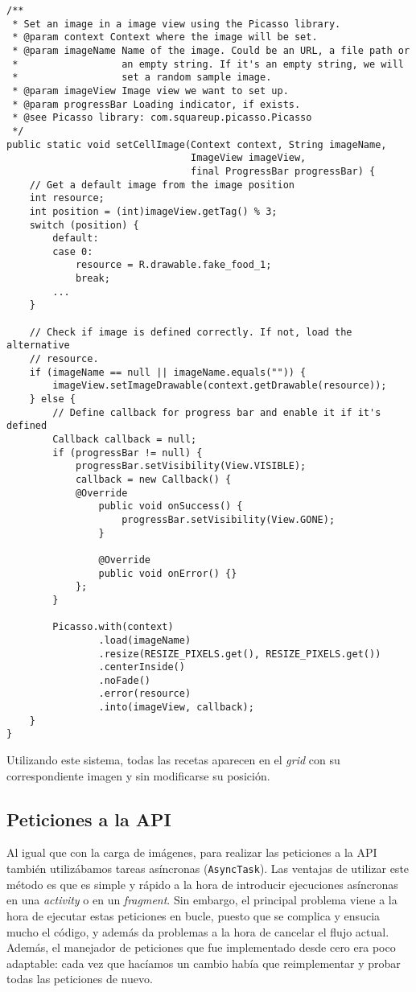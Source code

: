 \begin{verbatim}
/**
 * Set an image in a image view using the Picasso library.
 * @param context Context where the image will be set.
 * @param imageName Name of the image. Could be an URL, a file path or
 *                  an empty string. If it's an empty string, we will
 *                  set a random sample image.
 * @param imageView Image view we want to set up.
 * @param progressBar Loading indicator, if exists.
 * @see Picasso library: com.squareup.picasso.Picasso
 */
public static void setCellImage(Context context, String imageName,
                                ImageView imageView,
                                final ProgressBar progressBar) {
    // Get a default image from the image position
    int resource;
    int position = (int)imageView.getTag() % 3;
    switch (position) {
        default:
        case 0:
            resource = R.drawable.fake_food_1;
            break;
        ...
    }

    // Check if image is defined correctly. If not, load the alternative
    // resource.
    if (imageName == null || imageName.equals("")) {
        imageView.setImageDrawable(context.getDrawable(resource));
    } else {
        // Define callback for progress bar and enable it if it's defined
        Callback callback = null;
        if (progressBar != null) {
            progressBar.setVisibility(View.VISIBLE);
            callback = new Callback() {
            @Override
                public void onSuccess() {
                    progressBar.setVisibility(View.GONE);
                }

                @Override
                public void onError() {}
            };
        }

        Picasso.with(context)
                .load(imageName)
                .resize(RESIZE_PIXELS.get(), RESIZE_PIXELS.get())
                .centerInside()
                .noFade()
                .error(resource)
                .into(imageView, callback);
    }
}
\end{verbatim}

Utilizando este sistema, todas las recetas aparecen en el \textit{grid} con su
correspondiente imagen y sin modificarse su posición.


\subsection{Peticiones a la API}

Al igual que con la carga de imágenes, para realizar las peticiones a la API
también utilizábamos tareas asíncronas (\texttt{AsyncTask}). Las ventajas de
utilizar este método es que es simple y rápido a la hora de introducir
ejecuciones asíncronas en una \textit{activity} o en un \textit{fragment}. Sin
embargo, el principal problema viene a la hora de ejecutar estas peticiones
en bucle, puesto que se complica y ensucia mucho el código, y además da problemas
a la hora de cancelar el flujo actual. Además, el manejador de peticiones que
fue implementado desde cero era poco adaptable: cada vez que hacíamos un cambio
había que reimplementar y probar todas las peticiones de nuevo.

